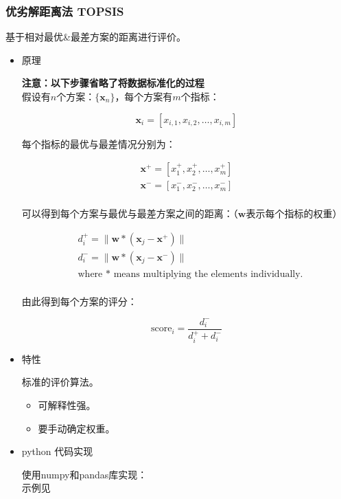\documentclass{article}
\begin{document}
\subsubsection{优劣解距离法 TOPSIS}

基于相对最优\&最差方案的距离进行评价。

\begin{itemize}

\item{原理}

\textbf{注意：以下步骤省略了将数据标准化的过程}\\
假设有$n$个方案：$\{\mathbf{x}_n\}$，每个方案有$m$个指标：

\[\mathbf{x}_i = [x_{i, 1}, x_{i, 2}, \ldots, x_{i, m}]\]

每个指标的最优与最差情况分别为：

\[\begin{split}
    \mathbf{x}^+ = [x^+_1, x^+_2, \ldots, x^+_m]\\
    \mathbf{x}^- = [x^-_1, x^-_2, \ldots, x^-_m]\\
\end{split}\]

可以得到每个方案与最优与最差方案之间的距离：（$\mathbf{w}$表示每个指标的权重）

\[\begin{split}
    & d^+_i = \lVert\mathbf{w} * (\mathbf{x}_j - \mathbf{x}^+)\rVert\\
    & d^-_i = \lVert\mathbf{w} * (\mathbf{x}_j - \mathbf{x}^-)\rVert\\
    & \text{where } * \text{ means multiplying the elements individually.}\\
\end{split}\]

由此得到每个方案的评分：

\[\text{score}_i = \frac{d^-_i}{d^+_i + d^-_i}\]

\item{特性}

标准的评价算法。

\begin{itemize}
    \item 可解释性强。
    \item 要手动确定权重。
\end{itemize}

\item{python 代码实现}

使用numpy和pandas库实现：\\
示例见

\end{itemize}
\end{document}
